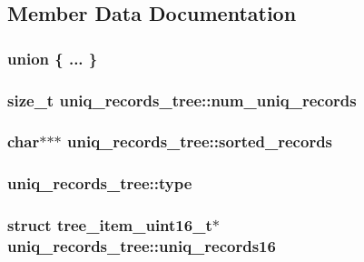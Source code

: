\subsection{\-Member \-Data \-Documentation}
\hypertarget{structuniq__records__tree_adc7aeac454a38e2ed5bebd81107aa8cc}{\subsubsection[{"@2}]{\setlength{\rightskip}{0pt plus 5cm}union \{ ... \} }}\label{structuniq__records__tree_adc7aeac454a38e2ed5bebd81107aa8cc}
\hypertarget{structuniq__records__tree_ad29c48d8c32333c64850922e14f07653}{
\subsubsection[{num\-\_\-uniq\-\_\-records}]{\setlength{\rightskip}{0pt plus 5cm}size\-\_\-t {\bf uniq\-\_\-records\-\_\-tree\-::num\-\_\-uniq\-\_\-records}}}\label{structuniq__records__tree_ad29c48d8c32333c64850922e14f07653}
\hypertarget{structuniq__records__tree_a540f291b5bca77a28be774fa2bfaa4a7}{
\subsubsection[{sorted\-\_\-records}]{\setlength{\rightskip}{0pt plus 5cm}char$\ast$$\ast$$\ast$ {\bf uniq\-\_\-records\-\_\-tree\-::sorted\-\_\-records}}}\label{structuniq__records__tree_a540f291b5bca77a28be774fa2bfaa4a7}
\hypertarget{structuniq__records__tree_a2bd28ef4c61dd21453af3c5b1bcfae99}{
\subsubsection[{type}]{ {\bf uniq\-\_\-records\-\_\-tree\-::type}}}\label{structuniq__records__tree_a2bd28ef4c61dd21453af3c5b1bcfae99}
\hypertarget{structuniq__records__tree_a9df29b0df41a45e032b92224b454f52e}{
\subsubsection[{uniq\-\_\-records16}]{\setlength{\rightskip}{0pt plus 5cm}struct tree\-\_\-item\-\_\-uint16\-\_\-t$\ast$ {\bf uniq\-\_\-records\-\_\-tree\-::uniq\-\_\-records16}}}\label{structuniq__records__tree_a9df29b0df41a45e032b92224b454f52e}
